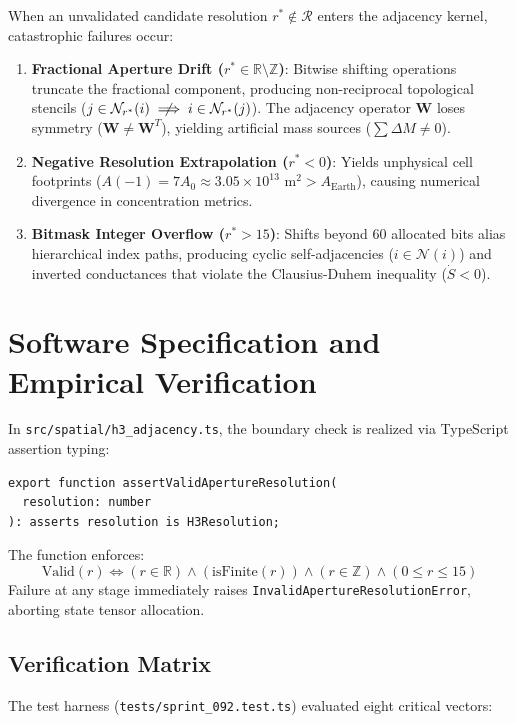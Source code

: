 \documentclass[11pt,a4paper]{article}
\begin{document}
When an unvalidated candidate resolution $r^* \notin \mathcal{R}$ enters the adjacency kernel, catastrophic failures occur:
\begin{enumerate}
    \item \textbf{Fractional Aperture Drift ($r^* \in \mathbb{R} \setminus \mathbb{Z}$)}: Bitwise shifting operations truncate the fractional component, producing non-reciprocal topological stencils ($j \in \mathcal{N}_{r^*}(i) \centernot\implies i \in \mathcal{N}_{r^*}(j)$). The adjacency operator $\mathbf{W}$ loses symmetry ($\mathbf{W} \ne \mathbf{W}^T$), yielding artificial mass sources ($\sum \Delta M \ne 0$).
    \item \textbf{Negative Resolution Extrapolation ($r^* < 0$)}: Yields unphysical cell footprints ($A(-1) = 7 A_0 \approx 3.05 \times 10^{13} \text{ m}^2 > A_{\text{Earth}}$), causing numerical divergence in concentration metrics.
    \item \textbf{Bitmask Integer Overflow ($r^* > 15$)}: Shifts beyond 60 allocated bits alias hierarchical index paths, producing cyclic self-adjacencies ($i \in \mathcal{N}(i)$) and inverted conductances that violate the Clausius-Duhem inequality ($\dot{S} < 0$).
\end{enumerate}

\section{Software Specification and Empirical Verification}

In \texttt{src/spatial/h3\_adjacency.ts}, the boundary check is realized via TypeScript assertion typing:
\begin{verbatim}
export function assertValidApertureResolution(
  resolution: number
): asserts resolution is H3Resolution;
\end{verbatim}

The function enforces:
\begin{equation}
\text{Valid}(r) \iff (r \in \mathbb{R}) \land (\text{isFinite}(r)) \land (r \in \mathbb{Z}) \land (0 \le r \le 15)
\end{equation}
Failure at any stage immediately raises \texttt{InvalidApertureResolutionError}, aborting state tensor allocation.

\subsection{Verification Matrix}
The test harness (\texttt{tests/sprint\_092.test.ts}) evaluated eight critical vectors:
\end{document}
